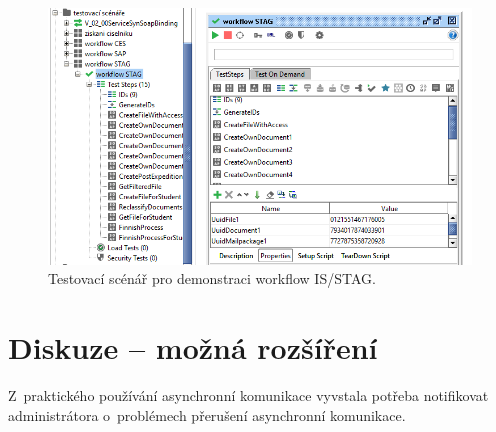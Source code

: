 \documentclass[
  master,
  field=ainfp,
  biblatex,
  language=czech,
  glossaries,
  theorems=false,
  index
]{kidiplom}
\begin{document}
\newpage
\begin{figure}[h]
  \centerline{\includegraphics[width=0.9\linewidth]{./images/TestSuite.png}} 
  \caption{Testovací scénář pro demonstraci workflow IS/STAG.} 
\end{figure}

\newpage
\section{Diskuze -- možná rozšíření}
Z~praktického používání asynchronní komunikace vyvstala potřeba notifikovat administrátora o~problémech přerušení asynchronní komunikace.
\end{document}
